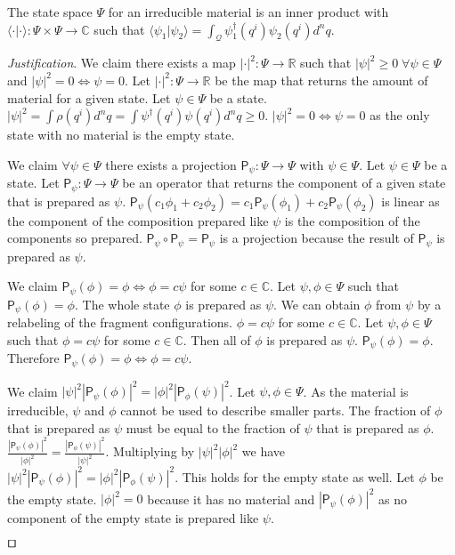 \documentclass[smallextended]{svjour3}
\numberwithin{equation}{section}
\newenvironment{justification}{\emph{Justification}.}{\hfill\(\qed\)}
\begin{document}
\begin{prop}\label{prop:inner_product}
	The state space $\Psi$ for an irreducible material is an inner product with $\langle \cdot |\cdot \rangle : \Psi \times \Psi \rightarrow \mathbb{C}$ such that $\langle \psi_1 | \psi_2 \rangle = \int_\mathcal{Q} \psi_1^\dagger (q^i) \psi_2(q^i) d^nq$.
\end{prop}
\begin{justification}
	We claim there exists a map $| \cdot | ^2 : \Psi \rightarrow \mathbb{R}$ such that $|\psi|^2 \ge 0 \; \forall \psi \in \Psi$ and $|\psi|^2 = 0 \Leftrightarrow \psi = 0$. Let $| \cdot | ^2 : \Psi \rightarrow \mathbb{R}$ be the map that returns the amount of material for a given state. Let $\psi \in \Psi$ be a state. $|\psi|^2 = \int \rho(q^i) d^nq = \int \psi^\dagger(q^i) \psi(q^i) d^nq \ge 0$. $|\psi|^2 = 0 \Leftrightarrow \psi = 0$ as the only state with no material is the empty state.
	
	We claim $\forall \psi \in \Psi$ there exists a projection $\mathsf{P}_\psi : \Psi \rightarrow \Psi$ with $\psi \in \Psi$. Let $\psi \in \Psi$ be a state. Let $\mathsf{P}_\psi : \Psi \rightarrow \Psi$ be an operator that returns the component of a given state that is prepared as $\psi$. $\mathsf{P}_{\psi}(c_1 \phi_1 + c_2 \phi_2) = c_1 \mathsf{P}_{\psi}(\phi_1) + c_2 \mathsf{P}_{\psi}(\phi_2)$ is linear as the component of the composition prepared like $\psi$ is the composition of the components so prepared. $\mathsf{P}_\psi \circ \mathsf{P}_\psi = \mathsf{P}_\psi$ is a projection because the result of $\mathsf{P}_\psi$  is prepared as $\psi$. 
	
	We claim $\mathsf{P}_{\psi} (\phi) = \phi \Leftrightarrow \phi = c \psi$ for some $c \in \mathbb{C}$. Let $\psi, \phi \in \Psi$ such that $\mathsf{P}_{\psi} (\phi) = \phi$. The whole state $\phi$ is prepared as $\psi$. We can obtain $\phi$ from $\psi$ by a relabeling of the fragment configurations. $\phi = c \psi$ for some $c \in \mathbb{C}$. Let $\psi, \phi \in \Psi$ such that $\phi = c \psi$ for some $c \in \mathbb{C}$. Then all of $\phi$ is prepared as $\psi$. $\mathsf{P}_{\psi} (\phi) = \phi$. Therefore $\mathsf{P}_{\psi} (\phi) = \phi \Leftrightarrow \phi = c \psi$.
	
	We claim $|\psi|^2|\mathsf{P}_{\psi} (\phi)|^2=|\phi|^2|\mathsf{P}_{\phi} (\psi)|^2$. Let $\psi, \phi \in \Psi$. As the material is irreducible, $\psi$ and $\phi$ cannot be used to describe smaller parts. The fraction of $\phi$ that is prepared as $\psi$ must be equal to the fraction of $\psi$ that is prepared as $\phi$. $\frac{|\mathsf{P}_{\psi} (\phi)|^2}{|\phi|^2}=\frac{|\mathsf{P}_{\phi} (\psi)|^2}{|\psi|^2}$. Multiplying by $|\psi|^2|\phi|^2$ we have $|\psi|^2|\mathsf{P}_{\psi} (\phi)|^2=|\phi|^2|\mathsf{P}_{\phi} (\psi)|^2$. This holds for the empty state as well. Let $\phi$ be the empty state. $|\phi|^2=0$ because it has no material and $|\mathsf{P}_{\psi} (\phi)|^2$ as no component of the empty state is prepared like $\psi$.
	

\end{justification}
\end{document}
